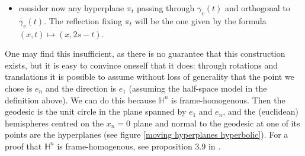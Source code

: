 \begin{itemize}
\begin{itemize}
		\item consider now any hyperplane  $\pi_t$ passing through $\gamma_v(t)$ and orthogonal to  $\dot{\gamma_v}(t)$. The reflection fixing $\pi_t$ will be the one given by the formula $(x, t)\mapsto (x, 2s-t)$.
	\end{itemize}
	One may find this insufficient, as there is no guarantee that this construction exists, but it is easy to convince oneself that it does: through rotations and translations it is possible to assume without loss of generality that the point we chose is $e_n$ and the direction is $e_1$ (assuming the half-space model in the definition above). We can do this because $\mathbb{H}^n$ is frame-homogenous. Then the geodesic is the unit circle in the plane spanned by $e_1$ and $e_n$, and the (euclidean) hemispheres centred on the $x_n=0$ plane and normal to the geodesic at one of its points are the hyperplanes (see figure \ref{moving hyperplanes hyperbolic}). For a proof that $\mathbb{H}^n$ is frame-homogenous, see proposition 3.9 in \cite{LeeRiemannian2ndEd}.
\end{itemize}

